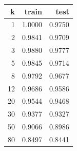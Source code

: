 \begin{tabular}{rrr}
\toprule
k & train & test \\
\midrule
1 & 1.0000 & 0.9750 \\
2 & 0.9841 & 0.9709 \\
3 & 0.9880 & 0.9777 \\
5 & 0.9845 & 0.9714 \\
8 & 0.9792 & 0.9677 \\
12 & 0.9686 & 0.9586 \\
20 & 0.9544 & 0.9468 \\
30 & 0.9377 & 0.9327 \\
50 & 0.9066 & 0.8986 \\
80 & 0.8497 & 0.8441 \\
\bottomrule
\end{tabular}
